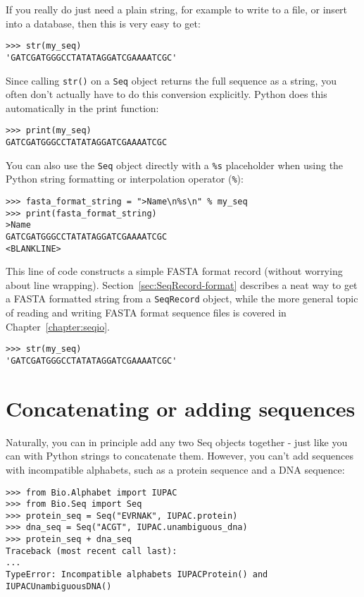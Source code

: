 If you really do just need a plain string, for example to write to a file, or insert into a database, then this is very easy to get:

\begin{verbatim}
>>> str(my_seq)
'GATCGATGGGCCTATATAGGATCGAAAATCGC'
\end{verbatim}

Since calling \verb|str()| on a \verb|Seq| object returns the full sequence as a string,
you often don't actually have to do this conversion explicitly.
Python does this automatically in the print function:

\begin{verbatim}
>>> print(my_seq)
GATCGATGGGCCTATATAGGATCGAAAATCGC
\end{verbatim}

You can also use the \verb|Seq| object directly with a \verb|%s| placeholder when using the Python string formatting or interpolation operator (\verb|%|):

\begin{verbatim}
>>> fasta_format_string = ">Name\n%s\n" % my_seq
>>> print(fasta_format_string)
>Name
GATCGATGGGCCTATATAGGATCGAAAATCGC
<BLANKLINE>
\end{verbatim}

\noindent This line of code constructs a simple FASTA format record (without worrying about line wrapping).
Section~\ref{sec:SeqRecord-format} describes a neat way to get a FASTA formatted
string from a \verb|SeqRecord| object, while the more general topic of reading and
writing FASTA format sequence files is covered in Chapter~\ref{chapter:seqio}.

\begin{verbatim}
>>> str(my_seq)
'GATCGATGGGCCTATATAGGATCGAAAATCGC'
\end{verbatim}

\section{Concatenating or adding sequences}

Naturally, you can in principle add any two Seq objects together - just like you can with Python strings to concatenate them.  However, you can't add sequences with incompatible alphabets, such as a protein sequence and a DNA sequence:

\begin{verbatim}
>>> from Bio.Alphabet import IUPAC
>>> from Bio.Seq import Seq
>>> protein_seq = Seq("EVRNAK", IUPAC.protein)
>>> dna_seq = Seq("ACGT", IUPAC.unambiguous_dna)
>>> protein_seq + dna_seq
Traceback (most recent call last):
...
TypeError: Incompatible alphabets IUPACProtein() and IUPACUnambiguousDNA()
\end{verbatim}

